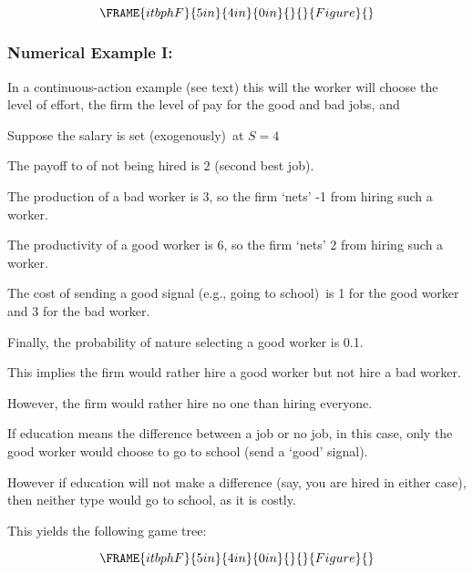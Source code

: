 \documentclass{article}
\begin{document}
\begin{equation}
\FRAME{itbphF}{5in}{4in}{0in}{}{}{Figure}{\special{language "Scientific
Word";type "GRAPHIC";maintain-aspect-ratio TRUE;display "USEDEF";valid_file
"T";width 5in;height 4in;depth 0in;original-width 7.3172in;original-height
4.9078in;cropleft "0";croptop "1";cropright "1";cropbottom "0";tempfilename
'JSHANV36.wmf';tempfile-properties "XPR";}}
\end{equation}

\subsubsection{Numerical Example I:}

In a continuous-action example (see text) this will the worker will choose
the level of effort, the firm the level of pay for the good and bad jobs, and

\bigskip

Suppose the salary is set (exogenously)\ at $S=4$

The payoff to of not being hired is $2$ (second best job).

The production of a bad worker is $3$, so the firm `nets' -1 from hiring
such a worker.

The productivity of a good worker is $6$, so the firm `nets' 2 from hiring
such a worker.

The cost of sending a good signal (e.g., going to school)\ is 1 for the good
worker and 3 for the bad worker.

\bigskip

Finally, the probability of nature selecting a good worker is 0.1. \

This implies the firm would rather hire a good worker but not hire a bad
worker.

However, the firm would rather hire no one than hiring everyone.

If education means the difference between a job or no job, in this case,
only the good worker would choose to go to school (send a `good' signal).

However if education will not make a difference (say, you are hired in
either case), then neither type would go to school, as it is costly.

This yields the following game tree:

\begin{equation}
\FRAME{itbphF}{5in}{4in}{0in}{}{}{Figure}{\special{language "Scientific
Word";type "GRAPHIC";maintain-aspect-ratio TRUE;display "USEDEF";valid_file
"T";width 5in;height 4in;depth 0in;original-width 7.8006in;original-height
5.7164in;cropleft "0";croptop "1";cropright "1";cropbottom "0";tempfilename
'JSHANW37.wmf';tempfile-properties "XPR";}}
\end{equation}
\end{document}
